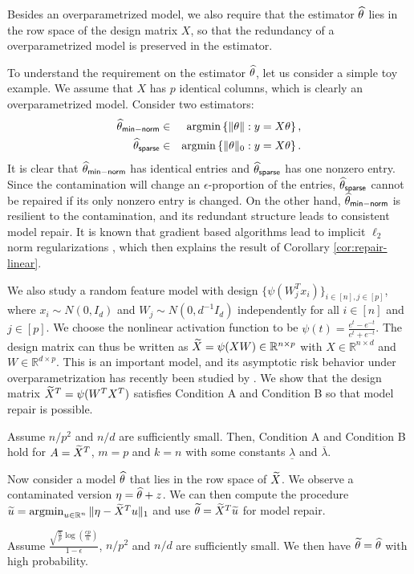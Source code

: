 Besides an overparametrized model, we also require that the estimator $\widehat{\theta}$ lies in the row space of the design matrix $X$, so that the redundancy of a overparametrized model is preserved in the estimator.
\begin{remark}
To understand the requirement on the estimator $\widehat{\theta}$, let us consider a simple toy example. We assume that $X$ has $p$ identical columns, which is clearly an overparametrized model. Consider two estimators:
\begin{eqnarray*}
\wh{\theta}_{\sf min-norm} &\in& \argmin\left\{\|\theta\|: y=X\theta\right\}, \\
\wh{\theta}_{\sf sparse} &\in& \argmin\left\{\|\theta\|_0: y=X\theta\right\}.
\end{eqnarray*}
It is clear that $\widehat{\theta}_{\sf min-norm}$ has identical entries and $\widehat{\theta}_{\sf sparse}$ has one nonzero entry. Since the contamination will change an $\epsilon$-proportion of the entries, $\widehat{\theta}_{\sf sparse}$ cannot be repaired if its only nonzero entry is changed. On the other hand, $\widehat{\theta}_{\sf min-norm}$ is resilient to the contamination, and its redundant structure leads to consistent model repair. It is known that gradient based algorithms lead to implicit $\ell_2$ norm regularizations \citep{neyshabur2014search}, which then explains the result of Corollary \ref{cor:repair-linear}.
\end{remark}


We also study a random feature model with design $\{\psi(W_j^Tx_i)\}_{i\in[n],j\in[p]}$, where $x_i\sim N(0,I_d)$ and $W_j\sim N(0,d^{-1}I_d)$ independently for all $i\in[n]$ and $j\in[p]$. We choose the nonlinear activation function to be $\psi(t)=\frac{e^t-e^{-t}}{e^t+e^{-t}}$. The design matrix can thus be written as $\widetilde{X}=\psi(XW)\in\mathbb{R}^{n\times p}$ with $X\in\mathbb{R}^{n\times d}$ and $W\in\mathbb{R}^{d\times p}$. This is an important model, and its asymptotic risk behavior under overparametrization has recently been studied by \cite{mei2019generalization}. We show that the design matrix $\widetilde{X}^T=\psi(W^TX^T)$ satisfies Condition A and Condition B so that model repair is possible.
\begin{lemma}\label{lem:design-rf}
Assume $n/p^2$ and $n/d$ are sufficiently small. Then, Condition A and Condition B hold for $A=\widetilde{X}^T$, $m=p$ and $k=n$ with some constants $\underline{\lambda}$ and $\overline{\lambda}$.
\end{lemma}

Now consider a model $\widehat{\theta}$ that lies in the row space of $\widetilde{X}$. We observe a contaminated version $\eta=\widehat{\theta}+z$.
We can then compute the procedure $\widetilde{u}=\mathop{\rm argmin}_{u\in\mathbb{R}^n}\|\eta-\widetilde{X}^Tu\|_1$ and use $\widetilde{\theta}=\widetilde{X}^T\widetilde{u}$ for model repair.

\begin{corollary}\label{cor:repair-rf}
Assume $\frac{\sqrt{\frac{n}{p}}\log\left(\frac{ep}{n}\right)}{1-\epsilon}$, $n/p^2$ and $n/d$ are sufficiently small. We then have $\widetilde{\theta}=\widehat{\theta}$ with high probability.
\end{corollary}